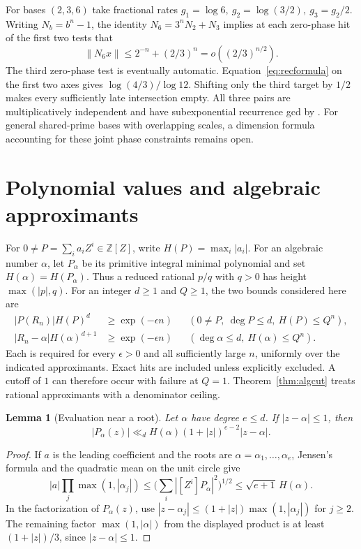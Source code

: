 \documentclass[11pt,a4paper,reqno]{amsart}
\newtheorem{lemma}[theorem]{Lemma}
\theoremstyle{definition}
\theoremstyle{remark}
\numberwithin{equation}{section}
\begin{document}
For bases \((2,3,6)\) take fractional rates \(g_1=\log6,\ g_2=\log(3/2),\ g_3=g_2/2\). Writing \(N_b=b^n-1\), the identity \(N_6=3^nN_2+N_3\) implies at each zero-phase hit of the first two tests that
\[
                \|N_6x\|\le 2^{-n}+(2/3)^n=o((2/3)^{n/2}).
\]
The third zero-phase test is eventually automatic. Equation~\eqref{eq:recformula} on the first two axes gives \(\log(4/3)/\log12\). Shifting only the third target by \(1/2\) makes every sufficiently late intersection empty. All three pairs are multiplicatively independent and have subexponential recurrence gcd by \cite{BCZ}. For general shared-prime bases with overlapping scales, a dimension formula accounting for these joint phase constraints remains open.

\section{Polynomial values and algebraic approximants}
\label{sec:higher-degree}

For \(0\ne P=\sum_i a_i Z^i\in\mathbb Z[Z]\), write
\(H(P)=\max_i|a_i|\). For an algebraic number \(\alpha\), let
\(P_\alpha\) be its primitive integral minimal polynomial and set
\(H(\alpha)=H(P_\alpha)\). Thus a reduced rational \(p/q\) with
\(q>0\) has height \(\max(|p|,q)\). For an integer \(d\ge1\) and
\(Q\ge1\), the two bounds considered here are
\begin{align}
  |P(R_n)|H(P)^d &\ge \exp(-\epsilon n)
  &&(0\ne P,\ \deg P\le d,\ H(P)\le Q^n), \label{eq:higher-poly}\\
  |R_n-\alpha|H(\alpha)^{d+1} &\ge \exp(-\epsilon n)
  &&(\deg\alpha\le d,\ H(\alpha)\le Q^n). \label{eq:higher-root}
\end{align}
Each is required for every \(\epsilon>0\) and all sufficiently large
\(n\), uniformly over the indicated approximants. Exact hits are
included unless explicitly excluded. A cutoff of \(1\) can therefore
occur with failure at \(Q=1\). Theorem~\ref{thm:algcut} treats
rational approximants with a denominator ceiling.

\begin{lemma}[Evaluation near a root]\label{lem:higher-transfer}
Let \(\alpha\) have degree \(e\le d\). If \(|z-\alpha|\le1\), then
\[
 |P_\alpha(z)|\ll_d
 H(\alpha)(1+|z|)^{e-2}|z-\alpha|.
\]
\end{lemma}

\begin{proof}
If \(a\) is the leading coefficient and the roots are
\(\alpha=\alpha_1,\ldots,\alpha_e\), Jensen's formula and the
quadratic mean on the unit circle give
\[
 |a|\prod_j\max(1,|\alpha_j|)
 \le \Big(\sum_i |[Z^i]P_\alpha|^2\Big)^{1/2}
 \le \sqrt{e+1}\,H(\alpha).
\]
In the factorization of \(P_\alpha(z)\), use
\(|z-\alpha_j|\le(1+|z|)\max(1,|\alpha_j|)\) for \(j\ge2\).
The remaining factor \(\max(1,|\alpha|)\) from the displayed
product is at least \((1+|z|)/3\), since \(|z-\alpha|\le1\).
\end{proof}
\end{document}
